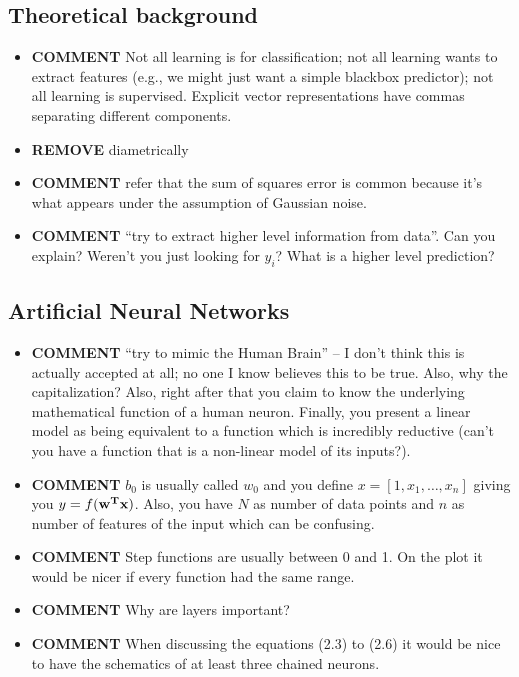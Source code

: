 \documentclass[11pt]{scrartcl} %
\begin{document}
\subsection*{Theoretical background}
\begin{itemize}
	\item {\bf COMMENT} Not all learning is for classification; not all learning wants to extract features (e.g., we might just want a simple blackbox predictor); not all learning is supervised. Explicit vector representations have commas separating different components.
	\item {\bf REMOVE} diametrically
	\item {\bf COMMENT} refer that the sum of squares error is common because it's what appears under the assumption of Gaussian noise.
	\item {\bf COMMENT} ``try to extract higher level information from data''. Can you explain? Weren't you just looking for $y_i$? What is a higher level prediction?
\end{itemize}

\subsection*{Artificial Neural Networks}
\begin{itemize}
	\item {\bf COMMENT} ``try to mimic the Human Brain'' -- I don't think this is actually accepted at all; no one I know believes this to be true. Also, why the capitalization? Also, right after that you claim to know the underlying mathematical function of a human neuron. Finally, you present a linear model as being equivalent to a function which is incredibly reductive (can't you have a function that is a non-linear model of its inputs?).
	\item {\bf COMMENT} $b_0$ is usually called $w_0$ and you define $x = [1, x_1, \dots, x_n]$ giving you $y=f(\bf{w}^T\bf{x})$. Also, you have $N$ as number of data points and $n$ as number of features of the input which can be confusing.
	\item {\bf COMMENT} Step functions are usually between 0 and 1. On the plot it would be nicer if every function had the same range.
	\item {\bf COMMENT} Why are layers important?
	\item {\bf COMMENT} When discussing the equations (2.3) to (2.6) it would be nice to have the schematics of at least three chained neurons.
\end{itemize}
\end{document}
